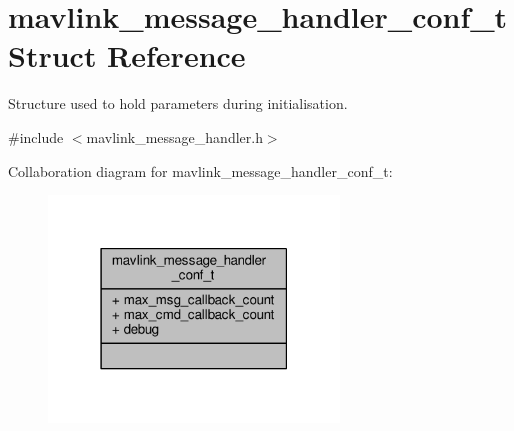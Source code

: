 \hypertarget{structmavlink__message__handler__conf__t}{\section{mavlink\+\_\+message\+\_\+handler\+\_\+conf\+\_\+t Struct Reference}
\label{structmavlink__message__handler__conf__t}
}


Structure used to hold parameters during initialisation.  




{\ttfamily \#include $<$mavlink\+\_\+message\+\_\+handler.\+h$>$}



Collaboration diagram for mavlink\+\_\+message\+\_\+handler\+\_\+conf\+\_\+t\+:
\nopagebreak
\begin{figure}[H]
\begin{center}
\leavevmode
\includegraphics[width=219pt]{structmavlink__message__handler__conf__t__coll__graph}
\end{center}
\end{figure}
